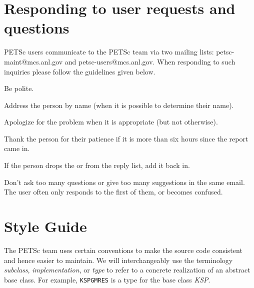\tableofcontents

\pagestyle{fancy}
\chapter{Responding to user requests and questions}

PETSc users communicate to the PETSc team via two mailing lists:
petsc-maint@mcs.anl.gov and petsc-users@mcs.anl.gov. When responding
to such inquiries please follow the guidelines given below.

\begin{tightitemize}
\item Be polite.
\item Address the person by name (when it is possible to determine their name).
\item Apologize for the problem when it is appropriate (but not otherwise).
\item Thank the person for their patience if it is more than six hours since the report came in.
\item If the person drops the  or  from the reply list, add it back in.
\item Don't ask too many questions or give too many suggestions in the same email. The user often only responds to the first of them, or becomes confused.
\end{tightitemize}

\chapter{Style Guide}\label{chapter:styleguide}

The PETSc team uses certain conventions to make the source code consistent and hence easier to maintain. We will interchangeably use the
terminology {\em subclass}, {\em implementation}, or {\em type} to refer to a concrete realization of an abstract base class. For example,
\lstinline{KSPGMRES} is a type for the base class {\em KSP}.

